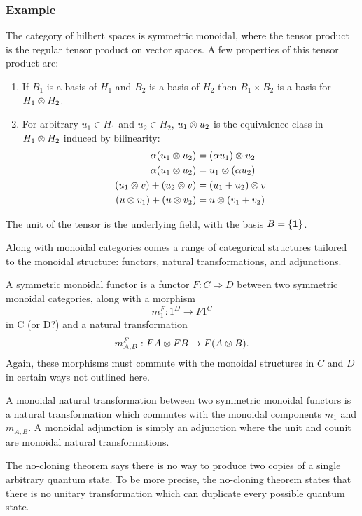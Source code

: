 \subsubsection*{Example}
The category of hilbert spaces is symmetric monoidal, where the tensor product
is the regular tensor product on vector spaces. A few properties of this tensor
product are:
\begin{enumerate}
    \item If $B_1$ is a basis of $H_1$ and $B_2$ is a basis of $H_2$
    then $B_1 \times B_2$ is a basis for $H_1 \otimes H_2$.
    \item For arbitrary $u_1 \in H_1$ and $u_2 \in H_2$, 
    $u_1 \otimes u_2$ is the equivalence class in $H_1 \otimes H_2$ induced
    by bilinearity:
    \begin{align*}
        \alpha(u_1 \otimes u_2) &= (\alpha u_1) \otimes u_2 \\
        \alpha(u_1 \otimes u_2) &= u_1 \otimes (\alpha u_2) \\
        (u_1 \otimes v) + (u_2 \otimes v) &= (u_1 + u_2) \otimes v \\
        (u \otimes v_1) + (u \otimes v_2) &= u \otimes (v_1 + v_2)
    \end{align*}
\end{enumerate}
The unit of the tensor is the underlying field, with the basis $B = \{ \mathbf{1} \}$.


Along with monoidal categories comes a range of categorical structures tailored
to the monoidal structure: functors, natural transformations, and adjunctions.

\begin{definition}
A symmetric monoidal functor is a functor $F : C \Rightarrow D$ between two symmetric
monoidal categories, along with a morphism
\[ m_1^F : 1^D \rightarrow F 1^C \]
in C (or D?) and a natural transformation
\[ m_{A,B}^F : F A \otimes F B \rightarrow F(A \otimes B). \]
Again, these morphisms must commute with the monoidal structures in $C$ and $D$
in certain ways not outlined here. 
\end{definition}

A monoidal natural transformation between two symmetric monoidal functors
is a natural transformation which commutes with the monoidal components $m_1$ and $m_{A,B}$.
A monoidal adjunction is simply an adjunction where the unit and counit
are monoidal natural transformations.


The no-cloning theorem says there is no way to produce two copies of a single 
arbitrary quantum state. To be more precise, the no-cloning theorem states that
there is no unitary transformation which can duplicate every possible quantum state.

